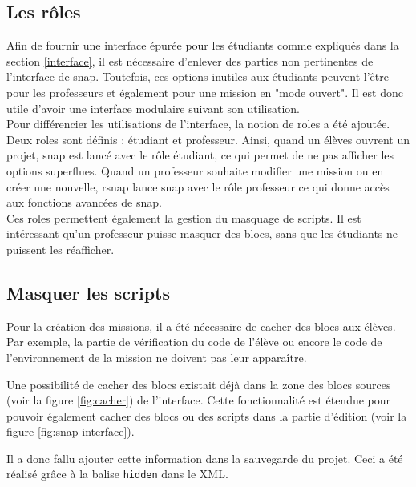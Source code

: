 \subsection{Les rôles}
\label{role}
Afin de fournir une interface épurée pour les étudiants comme expliqués dans la section \ref{interface}, il est nécessaire d'enlever des parties non pertinentes de l'interface de \gls{snap}. Toutefois, ces options inutiles aux étudiants peuvent l'être pour les professeurs et également pour une \gls{mission} en "mode ouvert". Il est donc utile d'avoir une interface modulaire suivant son utilisation. \\

Pour différencier les utilisations de l'interface, la notion de \glspl{role} a été ajoutée. Deux \glspl{role} sont définis : étudiant et professeur. Ainsi, quand un élèves ouvrent un projet, \gls{snap} est lancé avec le rôle étudiant, ce qui permet de ne pas afficher les options superflues. Quand un professeur souhaite modifier une \gls{mission} ou en créer une nouvelle, \gls{rsnap} lance \gls{snap} avec le rôle professeur ce qui donne accès aux fonctions avancées de \gls{snap}.\\

Ces \glspl{role} permettent également la gestion du masquage de \glspl{script}. Il est intéressant qu'un professeur puisse masquer des \glspl{bloc}, sans que les étudiants ne puissent les réafficher.

\subsection{Masquer les scripts}
Pour la création des \glspl{mission}, il a été nécessaire de cacher des \glspl{bloc} aux élèves. Par exemple, la partie de vérification du code de l'élève ou encore le code de l'environnement de la \gls{mission} ne doivent pas leur apparaître.

Une possibilité de cacher des \glspl{bloc} existait déjà dans la zone des \glspl{bloc} sources (voir la figure \ref{fig:cacher}) de l'interface. Cette fonctionnalité est étendue pour pouvoir également cacher des \glspl{bloc} ou des \glspl{script} dans la partie d'édition (voir la figure \ref{fig:snap interface}).

Il a donc fallu ajouter cette information dans la sauvegarde du projet. Ceci a été réalisé grâce à la balise \texttt{hidden} dans le XML.\\


